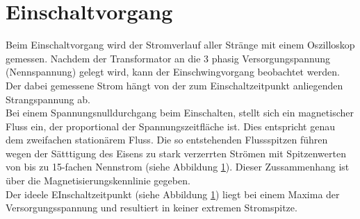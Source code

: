 \section{Einschaltvorgang}
Beim Einschaltvorgang wird der Stromverlauf aller Stränge mit einem Oszilloskop gemessen. Nachdem der Transformator an die 3 phasig Versorgungspannung (Nennspannung) gelegt wird, kann der Einschwingvorgang beobachtet werden. Der dabei gemessene Strom hängt von der zum Einschaltzeitpunkt anliegenden Strangspannung ab.\\
Bei einem Spannungsnulldurchgang beim Einschalten, stellt sich ein magnetischer Fluss ein, der proportional der Spannungszeitfläche ist. Dies entspricht genau dem zweifachen stationärem Fluss. Die so entstehenden Flussspitzen führen wegen der Sätttigung des Eisens zu stark verzerrten Strömen mit Spitzenwerten von bis zu 15-fachen Nennstrom (siehe Abbildung \ref{}). Dieser Zussammenhang ist über die Magnetisierungskennlinie gegeben. \\
Der ideele EInschaltzeitpunkt (siehe Abbildung \ref{}) liegt bei einem Maxima der Versorgungsspannung und resultiert in keiner extremen Stromspitze.

